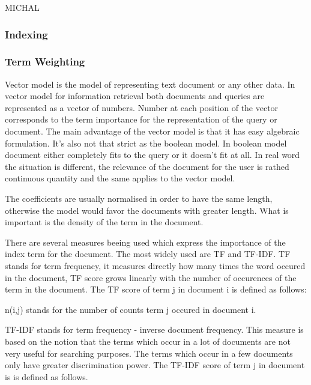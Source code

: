 MICHAL 

\subsubsection{Indexing}
\label{sec:indexing_term_weighting}

\subsubsection{Term Weighting}
\label{sec:term_weighting}

Vector model is the model of representing text document or any other data. In vector model for information retrieval both documents and queries are represented as a vector of numbers. Number at each position of the vector corresponds to the term importance for the representation of the query or document. The main advantage of the vector model is that it has easy algebraic formulation. It's also not that strict as the boolean model. In boolean model document either completely fits to the query or it doesn't fit at all. In real word the situation is different, the relevance of the document for the user is rathed continuous quantity and the same applies to the vector model.

The coefficients are usually normalised in order to have the same length, otherwise the model would favor the documents with greater length. What is important is the density of the term in the document.

There are several measures beeing used which express the importance of the index term for the document. The most widely used are TF and TF-IDF. 
TF stands for term frequency, it measures directly how many times the word occured in the document, TF score grows linearly with the number of occurences of the term in the document. The TF score of term j in document i is defined as follows:


n(i,j) stands for the number of counts term j occured in document i.

TF-IDF stands for term frequency - inverse document frequency. This measure is based on the notion that the terms which occur in a lot of documents are not very useful for searching purposes. The terms which occur in a few documents only have greater discrimination power. The TF-IDF score of term j in document is is defined as follows.


